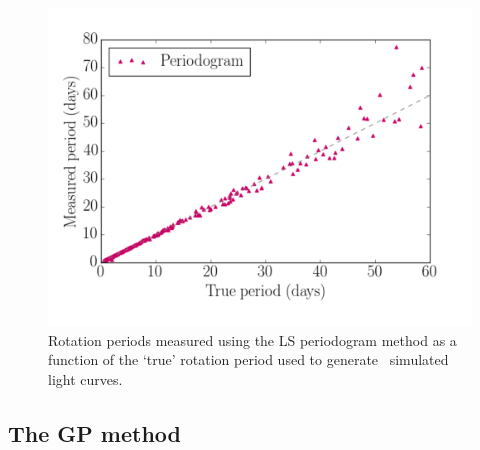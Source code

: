 \begin{figure}
\begin{center}
\includegraphics[width=6in, clip=true]{figures/compare_pgram.pdf}
\caption[LS periodogram results.]
{Rotation periods measured using the LS periodogram method as a
function of the `true' rotation period used to generate \nlightcurves\
simulated light curves.}
\label{fig:pgram_compare_noise_free}
\end{center}
\end{figure}

\subsection{The GP method}

